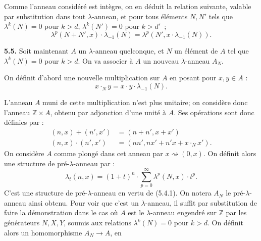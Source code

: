 
Comme l'anneau considéré est intègre, on en déduit la relation suivante, valable par substitution dans tout \(\lambda\)-anneau, et pour tous éléments \(N,N'\) tels que \(\lambda^k(N)=0\) pour \(k>d\), \(\lambda^k(N')=0\) pour \(k>d'\)~;
\begin{equation}\tag{5.4.2}
  \lambda^p(N+N',x)\cdot\lambda_{-1}(N)=\lambda^p(N',x\cdot\lambda_{-1}(N)).
\end{equation}


\textbf{5.5.} Soit maintenant \(A\) un \(\lambda\)-anneau quelconque, et \(N\) un élément de \(A\) tel que \(\lambda^k(N)=0\) pour \(k>d\). On va associer à \(A\) un nouveau \(\lambda\)-anneau \(A_N\).

On définit d'abord une nouvelle multiplication sur \(A\) en posant pour \(x,y\in A\) :
\begin{equation}\tag{5.5.1}
  x\cdot_N y=x\cdot y\cdot\lambda_{-1}(N).
\end{equation}

L'anneau \(A\) muni de cette multiplication n'est plus unitaire; on considère donc l'anneau \(\mathbb Z\times A\), obtenu par adjonction d'une unité à \(A\). Ses opérations sont donc définies par :
\begin{equation}\tag{5.5.2}
\begin{aligned}
  (n,x)+(n',x')&=(n+n',x+x')\\
  (n,x)\cdot(n',x')&=(nn',nx'+n'x+x\cdot_N x').
\end{aligned}
\end{equation}
On considère \(A\) comme plongé dans cet anneau par \(x\rightsquigarrow(0,x)\). On définit alors une structure de pré-\(\lambda\)-anneau par :
\begin{equation}\tag{5.5.3}
  \lambda_t(n,x)=(1+t)^n\cdot\sum_{p=0}^{\infty}\lambda^p(N,x)\cdot t^p.
\end{equation}
C'est une structure de pré-\(\lambda\)-anneau en vertu de (5.4.1). On notera \(A_N\) le pré-\(\lambda\)-anneau ainsi obtenu. Pour voir que c'est un \(\lambda\)-anneau, il suffit par substitution de faire la démonstration dans le cas où \(A\) est le \(\lambda\)-anneau engendré sur \(\mathbb Z\) par les générateurs \(N,X,Y\), soumis aux relations \(\lambda^k(N)=0\) pour \(k>d\). On définit alors un homomorphisme \(A_N\to A\), en
